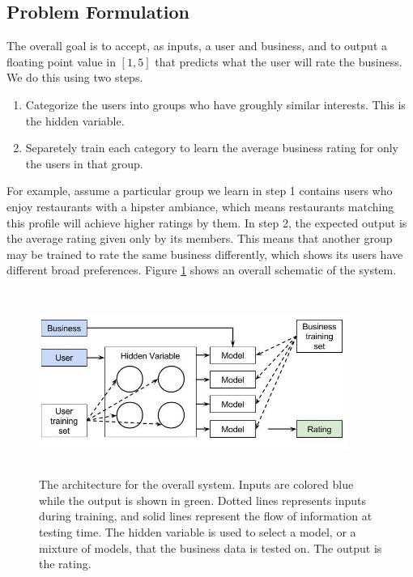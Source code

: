 \documentclass[11pt]{article}
\begin{document}
\subsection{Problem Formulation}
The overall goal is to accept, as inputs, a user and business, and to output a floating point value in $[1, 5]$ that predicts what the user will rate the business. We do this using two steps.

\begin{enumerate}
\item Categorize the users into groups who have groughly similar interests. This is the hidden variable.
\item Separetely train each category to learn the average business rating for only the users in that group.
\end{enumerate}

For example, assume a particular group we learn in step 1 contains users who enjoy restaurants with a hipster ambiance, which means restaurants matching this profile will achieve higher ratings by them. In step 2, the expected output is the average rating given only by its members. This means that another group may be trained to rate the same business differently, which shows its users have different broad preferences. Figure \ref{fig:system} shows an overall schematic of the system.\\

\begin{figure}[h!]
    \centering
    \includegraphics[width=0.9\textwidth, height=6cm]{system}
    \caption{The architecture for the overall system. Inputs are colored blue while the output is shown in green. Dotted lines represents inputs during training, and solid lines represent the flow of information at testing time. The hidden variable is used to select a model, or a mixture of models, that the business data is tested on. The output is the rating.}
    \label{fig:system}
\end{figure} 
\end{document}
